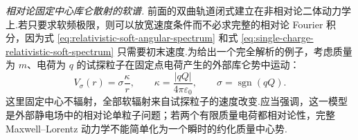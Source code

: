 \medskip
\noindent\textit{相对论固定中心库仑散射的软谱.}\quad
前面的双曲轨道闭式建立在非相对论二体动力学上.若只要求软频极限，则可以放宽速度条件而不必求完整的相对论 Fourier 积分，因为式 \eqref{eq:relativistic-soft-angular-spectrum} 和式 \eqref{eq:single-charge-relativistic-soft-spectrum} 只需要初末速度.为给出一个完全解析的例子，考虑质量为 $m$、电荷为 $q$ 的试探粒子在固定点电荷产生的外部库仑势中运动：
\begin{equation}
 V_\sigma(r)=\sigma\frac{\kappa}{r},
 \qquad
 \kappa=\frac{|qQ|}{4\pi\varepsilon_0},
 \qquad
 \sigma=\operatorname{sgn}(qQ).
 \label{eq:relativistic-fixed-center-coulomb-potential}
\end{equation}
这里固定中心不辐射，全部软辐射来自试探粒子的速度改变.应当强调，这一模型是外部静电场中的相对论单粒子问题；若两个有限质量电荷都相对论性，完整 Maxwell--Lorentz 动力学不能简单化为一个瞬时的约化质量中心势.

